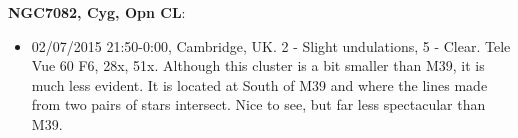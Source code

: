 {\bf NGC7082, Cyg, Opn CL}:
\begin{itemize}
\item 02/07/2015 21:50-0:00, Cambridge, UK. 2 - Slight undulations, 5 - Clear. Tele Vue 60 F6, 28x, 51x. Although this cluster is a bit smaller than M39, it is much less evident. It is located at South of M39 and where the lines made from two pairs of stars intersect. Nice to see, but far less spectacular than M39.
\end{itemize}
